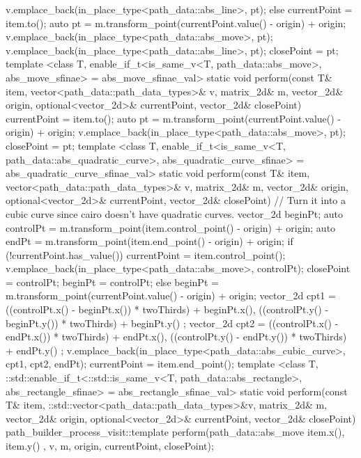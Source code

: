 \begin{codeblock}
{{{{          v.emplace_back(in_place_type<path_data::abs_line>, pt);
        }
        else {
          currentPoint = item.to();
          auto pt = m.transform_point(currentPoint.value() - origin) + origin;
          v.emplace_back(in_place_type<path_data::abs_move>, pt);
          v.emplace_back(in_place_type<path_data::abs_line>, pt);
          closePoint = pt;
        }
      }
      template <class T, enable_if_t<is_same_v<T, path_data::abs_move>, abs_move_sfinae> = abs_move_sfinae_val>
      static void perform(const T& item, vector<path_data::path_data_types>& v, matrix_2d& m, vector_2d& origin, optional<vector_2d>& currentPoint, vector_2d& closePoint) {
        currentPoint = item.to();
        auto pt = m.transform_point(currentPoint.value() - origin) + origin;
        v.emplace_back(in_place_type<path_data::abs_move>, pt);
        closePoint = pt;
      }
      template <class T, enable_if_t<is_same_v<T, path_data::abs_quadratic_curve>, abs_quadratic_curve_sfinae> = abs_quadratic_curve_sfinae_val>
      static void perform(const T& item, vector<path_data::path_data_types>& v, matrix_2d& m, vector_2d& origin, optional<vector_2d>& currentPoint, vector_2d& closePoint) {
        // Turn it into a cubic curve since cairo doesn't have quadratic curves.
        vector_2d beginPt;
        auto controlPt = m.transform_point(item.control_point() - origin) + origin;
        auto endPt = m.transform_point(item.end_point() - origin) + origin;
        if (!currentPoint.has_value()) {
          currentPoint = item.control_point();
          v.emplace_back(in_place_type<path_data::abs_move>, controlPt);
          closePoint = controlPt;
          beginPt = controlPt;
        }
        else {
          beginPt = m.transform_point(currentPoint.value() - origin) + origin;
        }
        vector_2d cpt1 = { ((controlPt.x() - beginPt.x()) * twoThirds) + beginPt.x(), ((controlPt.y() - beginPt.y()) * twoThirds) + beginPt.y() };
        vector_2d cpt2 = { ((controlPt.x() - endPt.x()) * twoThirds) + endPt.x(), ((controlPt.y() - endPt.y()) * twoThirds) + endPt.y() };
        v.emplace_back(in_place_type<path_data::abs_cubic_curve>, cpt1, cpt2, endPt);
        currentPoint = item.end_point();
      }
      template <class T, ::std::enable_if_t<::std::is_same_v<T, path_data::abs_rectangle>, abs_rectangle_sfinae> = abs_rectangle_sfinae_val>
      static void perform(const T& item, ::std::vector<path_data::path_data_types>&v, matrix_2d& m, vector_2d& origin, optional<vector_2d>& currentPoint, vector_2d& closePoint) {
        path_builder_process_visit::template perform(path_data::abs_move{ { item.x(), item.y() } }, v, m, origin, currentPoint, closePoint);
}}}
\end{codeblock}
